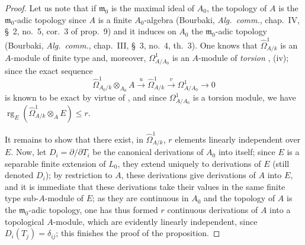 \begin{proof}
Let us note that if $\mathfrak{m}_0$ is the maximal ideal of $A_0$, the topology of $A$ is the $\mathfrak{m}_0$-adic topology since $A$ is a finite $A_0$-algebra (Bourbaki, \emph{Alg.\ comm.}, chap.~IV, \S~2, no.~5, cor.~3 of prop.~9) and it induces on $A_0$ the $\mathfrak{m}_0$-adic topology (Bourbaki, \emph{Alg.\ comm.}, chap.~III, \S~3, no.~4, th.~3).
One knows  that $\widehat{\Omega}^1_{A/k}$ is an $A$-module of finite type and, moreover, $\Omega^1_{A/A_0}$ is an $A$-module of \emph{torsion} , (iv); since the exact sequence 
\begin{equation}
\tag{21.9.5.2}
  \label{0.21.9.5.2}
  \widehat{\Omega}^1_{A_0/k}\otimes_{A_0} A\xrightarrow{u}\widehat{\Omega}^1_{A/k}\xrightarrow{v}\Omega^1_{A/A_0}\to 0
\end{equation}
is known to be exact by virtue of , and since $\Omega^1_{A/A_0}$ is a torsion module, we have
$\operatorname{rg}_E(\widehat{\Omega}^1_{A/k}\otimes_A E)\leqslant r$.

It remains to show that there exist, in $\widehat{\Omega}^1_{A/k}$, $r$ elements linearly independent over $E$.
Now, let $D_i=\partial/\partial T_i$ be the canonical derivations of $A_0$ into itself; since $E$ is a separable finite extension of $L_0$, they extend uniquely to derivations of $E$ (still denoted $D_i$); by restriction to $A$, these derivations give derivations of $A$ into $E$, and it is immediate that these derivations take their values in the same finite type sub-$A$-module of $E$; as they are continuous in $A_0$ and the topology of $A$ is the $\mathfrak{m}_0$-adic topology, one has thus formed $r$ continuous derivations of $A$ into a topological $A$-module, which are evidently linearly independent, since $D_i(T_j)=\delta_{ij}$; this finishes the proof of the proposition.
\end{proof}

